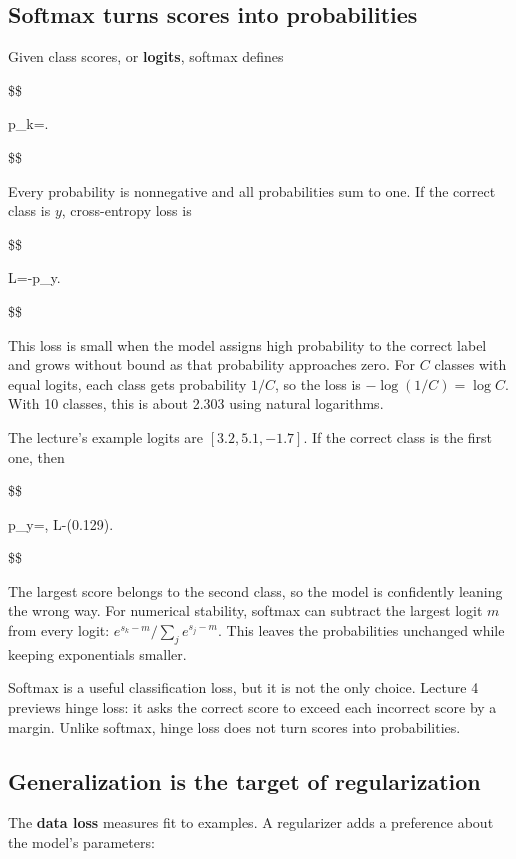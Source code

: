 \subsection{Softmax turns scores into probabilities}\label{04-visual-computing-ii-ch031-softmax-turns-scores-into-probabilities}

Given class scores, or \textbf{logits}, softmax defines

\$\$

p\_k=.

\$\$

Every probability is nonnegative and all probabilities sum to one. If the correct class is \(y\), cross-entropy loss is

\$\$

L=-\log p\_y.

\$\$

This loss is small when the model assigns high probability to the correct label and grows without bound as that probability approaches zero. For \(C\) classes with equal logits, each class gets probability \(1/C\), so the loss is \(-\log(1/C)=\log C\). With 10 classes, this is about 2.303 using natural logarithms.

The lecture's example logits are \([3.2,5.1,-1.7]\). If the correct class is the first one, then

\$\$

p\_y=, \qquad L\approx-\log(0.129).

\$\$

The largest score belongs to the second class, so the model is confidently leaning the wrong way. For numerical stability, softmax can subtract the largest logit \(m\) from every logit: \(e^{s_k-m}/\sum_j e^{s_j-m}\). This leaves the probabilities unchanged while keeping exponentials smaller.

Softmax is a useful classification loss, but it is not the only choice. Lecture 4 previews hinge loss: it asks the correct score to exceed each incorrect score by a margin. Unlike softmax, hinge loss does not turn scores into probabilities.

\subsection{Generalization is the target of regularization}\label{04-visual-computing-ii-ch031-generalization-is-the-target-of-regularization}

The \textbf{data loss} measures fit to examples. A regularizer adds a preference about the model's parameters:

